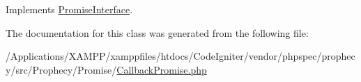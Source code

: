 Implements \mbox{\hyperlink{interface_prophecy_1_1_promise_1_1_promise_interface_a2b8542872672f9ac4ed0c942f931f0c6}{Promise\+Interface}}.



The documentation for this class was generated from the following file\+:\begin{DoxyCompactItemize}
\item 
/\+Applications/\+X\+A\+M\+P\+P/xamppfiles/htdocs/\+Code\+Igniter/vendor/phpspec/prophecy/src/\+Prophecy/\+Promise/\mbox{\hyperlink{_callback_promise_8php}{Callback\+Promise.\+php}}\end{DoxyCompactItemize}
